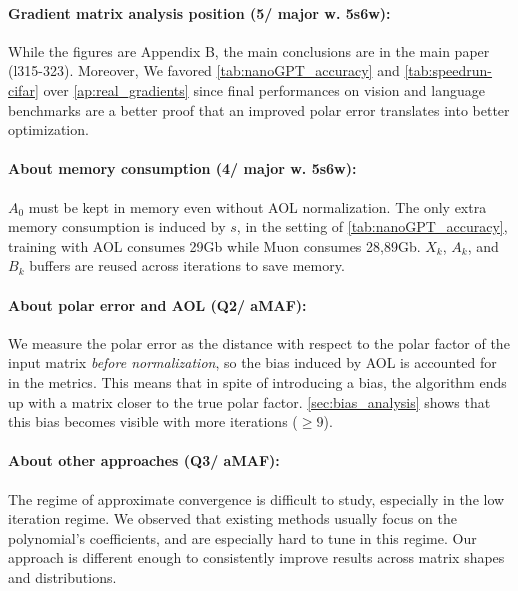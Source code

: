 \vspace{-4mm}
\paragraph{Gradient matrix analysis position (5/ major w. 5s6w):} While the figures are Appendix B, the main conclusions are in the main paper (l315-323). Moreover,  
We favored \cref{tab:nanoGPT_accuracy} and \cref{tab:speedrun-cifar} over \cref{ap:real_gradients} since final performances on vision and language benchmarks are a better proof that an improved polar error translates into better optimization.

\vspace{-4mm}
\paragraph{About memory consumption (4/ major w. 5s6w):} $A_0$ must be kept in memory even without AOL normalization. The only extra memory consumption is induced by $s$, in the setting of \cref{tab:nanoGPT_accuracy}, training with AOL consumes 29Gb while Muon consumes 28,89Gb. $X_k$, $A_k$, and $B_k$ buffers are reused across iterations to save memory.

\vspace{-4mm}
\paragraph{About polar error and AOL (Q2/ aMAF):} We measure the polar error as the distance with respect to the polar factor of the input matrix \textit{before normalization}, so the bias induced by AOL is accounted for in the metrics. This means that in spite of introducing a bias, the algorithm ends up with a matrix closer to the true polar factor. \cref{sec:bias_analysis} shows that this bias becomes visible with more iterations ($\geq 9$).

\vspace{-4mm}
\paragraph{About other approaches (Q3/ aMAF):} The regime of approximate convergence is difficult to study, especially in the low iteration regime. We observed that existing methods usually focus on the polynomial's coefficients, and are especially hard to tune in this regime. Our approach is different enough to consistently improve results across matrix shapes and distributions. 

